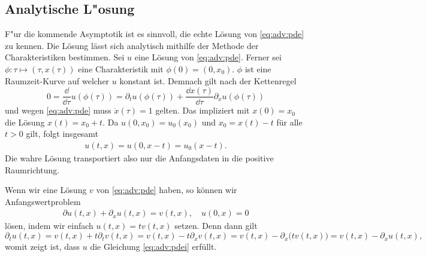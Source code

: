 \subsection {Analytische L"osung}

F"ur die kommende Asymptotik ist es sinnvoll, die echte Lösung von \eqref{eq:adv:pde} zu kennen.
Die Lösung lässt sich analytisch mithilfe der Methode der Charakteristiken bestimmen.
Sei $u$ eine Lösung von \eqref{eq:adv:pde}.
Ferner sei $\phi\colon \tau \mapsto (\tau, x(\tau))$ eine Charakteristik mit $\phi(0) = (0, x_0)$.
$\phi$ ist eine Raumzeit-Kurve auf welcher $u$ konstant ist.
Demnach gilt nach der Kettenregel
\[ 0 = \frac {\dd}{\dd \tau} u(\phi(\tau)) = \partial_t u(\phi(\tau))  + \frac {\dd x(\tau)} {\dd \tau} \partial_x u(\phi(\tau)) \]
und wegen \eqref{eq:adv:pde} muss $\dot x(\tau) = 1$ gelten.
Das impliziert mit $x(0) = x_0$ die Lösung $x(t) = x_0 + t$.
Da $u(0, x_0) = u_0(x_0)$ und $x_0 = x(t) - t$ für alle $t > 0$ gilt, folgt insgesamt
\begin{align}\label{eq:adv:solution}
u(t, x) = u(0, x - t) = u_0(x - t).
\end{align}
Die wahre Lösung transportiert also nur die Anfangsdaten in die positive Raumrichtung.

Wenn wir eine Lösung $v$ von \eqref{eq:adv:pde} haben, so können wir Anfangswertproblem
\begin{align}\label{eq:adv:pdei}
\partial u(t,x) + \partial_x u(t,x) = v(t,x), \quad u(0,x) = 0
\end{align}
lösen, indem wir einfach $u(t,x) = t v(t,x)$ setzen. Denn dann gilt
{\small
\[ \partial_t u(t,x) = v(t,x) + t \partial_t v(t,x) = v(t,x) - t \partial_x v(t,x) = v(t,x) - \partial_x \bigl( t v(t,x) \bigr) = v(t,x) - \partial_x u(t,x), \]
}
womit zeigt ist, dass $u$ die Gleichung \eqref{eq:adv:pdei} erfüllt.
